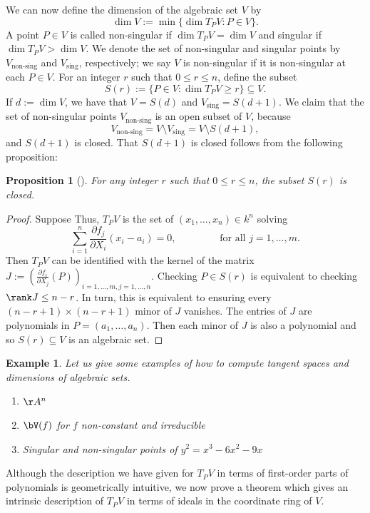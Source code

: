 \documentclass[12pt]{amsart}
\theoremstyle{plain}
\newtheorem{proposition}[theorem]{Proposition}
\newtheorem{example}[theorem]{Example}
\begin{document}
We can now define the dimension of the algebraic set $V$ by
$$\dim V := \min\{\dim T_PV : P \in V\}.$$
A point $P \in V$ is called non-singular if $\dim T_PV = \dim V$ and singular if $\dim T_P V > \dim V$.
We denote the set of non-singular and singular points by $V_{\text{non-sing}}$ and $V_{\text{sing}}$, respectively;
we say $V$ is non-singular if it is non-singular at each $P \in V$.
For an integer $r$ such that $0 \le r \le n$, define the subset
$$S(r) := \{P \in V : \dim T_P V \ge r\}\subseteq V.$$
If $d := \dim V$, we have that $V = S(d)$ and $V_{\text{sing}} = S(d+1)$.
We claim that the set of non-singular points $V_{\text{non-sing}}$ is an open subset of $V$, because
$$V_{\text{non-sing}} = V \setminus V_{\text{sing}} = V \setminus S(d+1),$$
and $S(d+1)$ is closed. 
That $S(d+1)$ is closed follows from the following proposition:

\begin{proposition}[{\cite[\S 6.5]{Reid88}}]
For any integer $r$ such that $0 \le r \le n$, the subset $S(r)$ is closed.
\end{proposition}
\begin{proof}
Suppose 
Thus, $T_PV$ is the set of $(x_1, \ldots, x_n) \in k^n$ solving
$$\sum_{i=1}^n \frac{\partial f_j}{\partial X_i} (x_i - a_i) = 0, \qquad \qquad \text{ for all } j = 1, \ldots, m.$$
Then $T_PV$ can be identified with the kernel of the matrix $J := \left(\frac{\partial f_i}{\partial X_j}(P)\right)_{i=1,\ldots, m, j=1, \ldots, n}.$
Checking $P \in S(r)$ is equivalent to checking $\rank J \le n-r$.
In turn, this is equivalent to ensuring every $(n-r+1)\times(n-r+1)$ minor of $J$ vanishes.
The entries of $J$ are polynomials in $P=(a_1, \ldots, a_n)$.
Then each minor of $J$ is also a polynomial and so $S(r) \subseteq V$ is an algebraic set.
\end{proof}

\begin{example}
Let us give some examples of how to compute tangent spaces and dimensions of algebraic sets.
\begin{enumerate}
\item $\AA^n$
\item $\bV(f)$ for $f$ non-constant and irreducible
\item Singular and non-singular points of $y^2=x^3-6x^2-9x$
\end{enumerate}
\end{example}

Although the description we have given for $T_PV$ in terms of first-order parts of polynomials is geometrically intuitive, we now prove a theorem which gives an intrinsic description of $T_PV$ in terms of ideals in the coordinate ring of $V$.
\end{document}
